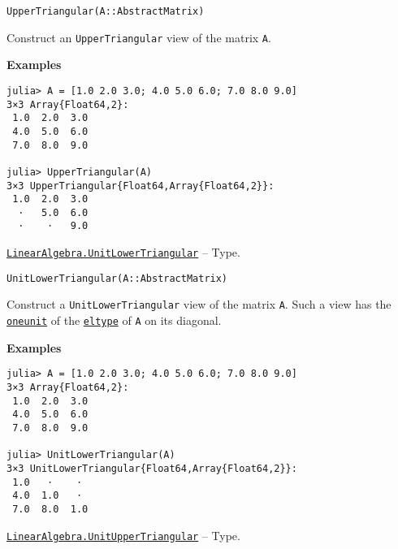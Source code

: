 \begin{adjustwidth}{2em}{0pt}


\begin{verbatim}
UpperTriangular(A::AbstractMatrix)
\end{verbatim}

Construct an \texttt{UpperTriangular} view of the matrix \texttt{A}.

\textbf{Examples}


\begin{verbatim}
julia> A = [1.0 2.0 3.0; 4.0 5.0 6.0; 7.0 8.0 9.0]
3×3 Array{Float64,2}:
 1.0  2.0  3.0
 4.0  5.0  6.0
 7.0  8.0  9.0

julia> UpperTriangular(A)
3×3 UpperTriangular{Float64,Array{Float64,2}}:
 1.0  2.0  3.0
  ⋅   5.0  6.0
  ⋅    ⋅   9.0
\end{verbatim}



\end{adjustwidth}
\hypertarget{2163321084999097240}{} 
\hyperlink{2163321084999097240}{\texttt{LinearAlgebra.UnitLowerTriangular}}  -- {Type.}

\begin{adjustwidth}{2em}{0pt}


\begin{verbatim}
UnitLowerTriangular(A::AbstractMatrix)
\end{verbatim}

Construct a \texttt{UnitLowerTriangular} view of the matrix \texttt{A}. Such a view has the \hyperlink{2310843180104103470}{\texttt{oneunit}} of the \hyperlink{6396209842929672718}{\texttt{eltype}} of \texttt{A} on its diagonal.

\textbf{Examples}


\begin{verbatim}
julia> A = [1.0 2.0 3.0; 4.0 5.0 6.0; 7.0 8.0 9.0]
3×3 Array{Float64,2}:
 1.0  2.0  3.0
 4.0  5.0  6.0
 7.0  8.0  9.0

julia> UnitLowerTriangular(A)
3×3 UnitLowerTriangular{Float64,Array{Float64,2}}:
 1.0   ⋅    ⋅
 4.0  1.0   ⋅
 7.0  8.0  1.0
\end{verbatim}



\end{adjustwidth}
\hypertarget{17221720404477798393}{} 
\hyperlink{17221720404477798393}{\texttt{LinearAlgebra.UnitUpperTriangular}}  -- {Type.}

